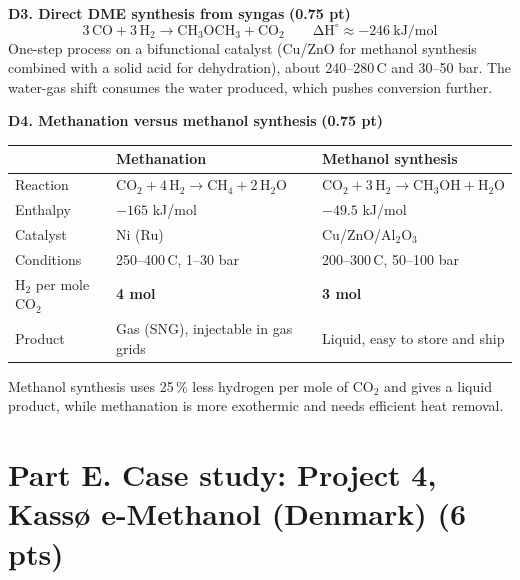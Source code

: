 \documentclass[11pt,a4paper]{article}
\newcommand{\degC}{\,\textdegree C}
\newcommand{\pts}[1]{\hfill{\normalsize\textbf{(#1)}}}
\newcommand{\rxn}[1]{\[\mathrm{#1}\]}
\begin{document}
\textbf{D3. Direct DME synthesis from syngas} \pts{0.75 pt}
\rxn{3\,CO + 3\,H_2 \longrightarrow CH_3OCH_3 + CO_2 \qquad \Delta H^\circ \approx -246\ kJ/mol}
One-step process on a bifunctional catalyst (Cu/ZnO for methanol synthesis combined with a solid acid for dehydration),
about 240--280\degC{} and 30--50 bar. The water-gas shift consumes the water produced, which pushes conversion further.

\textbf{D4. Methanation versus methanol synthesis} \pts{0.75 pt}

{\small
\renewcommand{\arraystretch}{1.35}
\begin{tabularx}{\linewidth}{@{}>{\raggedright\arraybackslash}p{3.0cm}YY@{}}
\toprule
 & \textbf{Methanation} & \textbf{Methanol synthesis}\\
\midrule
Reaction & $\mathrm{CO_2 + 4\,H_2 \rightarrow CH_4 + 2\,H_2O}$ & $\mathrm{CO_2 + 3\,H_2 \rightarrow CH_3OH + H_2O}$\\
Enthalpy & $-165$ kJ/mol & $-49.5$ kJ/mol\\
Catalyst & Ni (Ru) & Cu/ZnO/Al$_2$O$_3$\\
Conditions & 250--400\degC, 1--30 bar & 200--300\degC, 50--100 bar\\
H$_2$ per mole CO$_2$ & \textbf{4 mol} & \textbf{3 mol}\\
Product & Gas (SNG), injectable in gas grids & Liquid, easy to store and ship\\
\bottomrule
\end{tabularx}}

Methanol synthesis uses 25\,\% less hydrogen per mole of CO$_2$ and gives a liquid product, while methanation is more
exothermic and needs efficient heat removal.

\section{Part E. Case study: Project 4, Kassø e-Methanol (Denmark) \pts{6 pts}}
\end{document}

